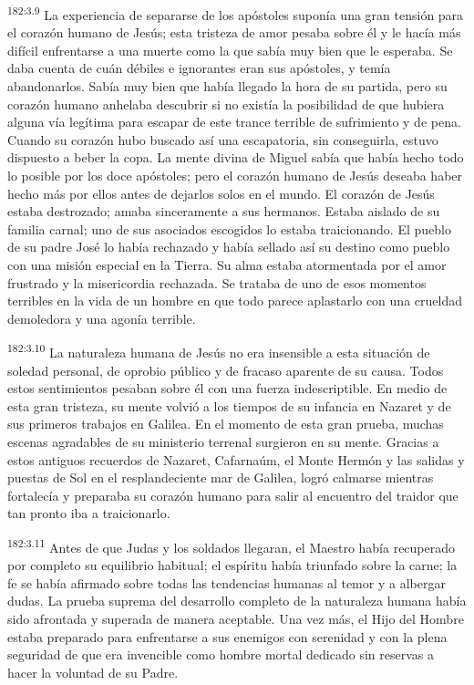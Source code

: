 \par 
\textsuperscript{182:3.9} La experiencia de separarse de los apóstoles suponía una gran tensión para el corazón humano de Jesús; esta tristeza de amor pesaba sobre él y le hacía más difícil enfrentarse a una muerte como la que sabía muy bien que le esperaba. Se daba cuenta de cuán débiles e ignorantes eran sus apóstoles, y temía abandonarlos. Sabía muy bien que había llegado la hora de su partida, pero su corazón humano anhelaba descubrir si no existía la posibilidad de que hubiera alguna vía legítima para escapar de este trance terrible de sufrimiento y de pena. Cuando su corazón hubo buscado así una escapatoria, sin conseguirla, estuvo dispuesto a beber la copa. La mente divina de Miguel sabía que había hecho todo lo posible por los doce apóstoles; pero el corazón humano de Jesús deseaba haber hecho más por ellos antes de dejarlos solos en el mundo. El corazón de Jesús estaba destrozado; amaba sinceramente a sus hermanos. Estaba aislado de su familia carnal; uno de sus asociados escogidos lo estaba traicionando. El pueblo de su padre José lo había rechazado y había sellado así su destino como pueblo con una misión especial en la Tierra. Su alma estaba atormentada por el amor frustrado y la misericordia rechazada. Se trataba de uno de esos momentos terribles en la vida de un hombre en que todo parece aplastarlo con una crueldad demoledora y una agonía terrible.

\par 
\textsuperscript{182:3.10} La naturaleza humana de Jesús no era insensible a esta situación de soledad personal, de oprobio público y de fracaso aparente de su causa. Todos estos sentimientos pesaban sobre él con una fuerza indescriptible. En medio de esta gran tristeza, su mente volvió a los tiempos de su infancia en Nazaret y de sus primeros trabajos en Galilea. En el momento de esta gran prueba, muchas escenas agradables de su ministerio terrenal surgieron en su mente. Gracias a estos antiguos recuerdos de Nazaret, Cafarnaúm, el Monte Hermón y las salidas y puestas de Sol en el resplandeciente mar de Galilea, logró calmarse mientras fortalecía y preparaba su corazón humano para salir al encuentro del traidor que tan pronto iba a traicionarlo.

\par 
\textsuperscript{182:3.11} Antes de que Judas y los soldados llegaran, el Maestro había recuperado por completo su equilibrio habitual; el espíritu había triunfado sobre la carne; la fe se había afirmado sobre todas las tendencias humanas al temor y a albergar dudas. La prueba suprema del desarrollo completo de la naturaleza humana había sido afrontada y superada de manera aceptable. Una vez más, el Hijo del Hombre estaba preparado para enfrentarse a sus enemigos con serenidad y con la plena seguridad de que era invencible como hombre mortal dedicado sin reservas a hacer la voluntad de su Padre.